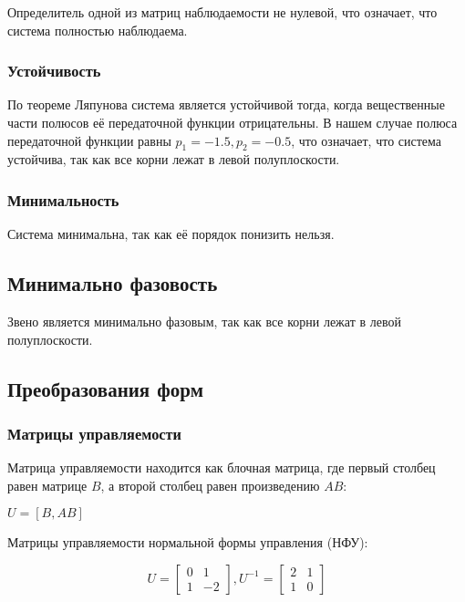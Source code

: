 Определитель одной из матриц наблюдаемости не нулевой, что означает, что система полностью наблюдаема.

\subsubsection{Устойчивость}

По теореме Ляпунова система является устойчивой тогда, когда вещественные части полюсов её передаточной функции отрицательны. В нашем случае полюса передаточной функции равны $p_1=-1.5, p_2=-0.5$, что означает, что система устойчива, так как все корни лежат в левой полуплоскости. 

\subsubsection{Минимальность}

Система минимальна, так как её порядок понизить нельзя.

\subsection{Минимально фазовость}

Звено является минимально фазовым, так как все корни лежат в левой полуплоскости. 

\subsection{Преобразования форм}

\subsubsection{Матрицы управляемости}

Матрица управляемости находится как блочная матрица, где первый столбец равен матрице $B$, а второй столбец равен произведению $AB$:

\begin{center}
$U=[B, AB]$
\end{center}

Матрицы управляемости нормальной формы управления (НФУ):

\begin{equation*}
\text{$U= \begin{bmatrix}
0 & 1\\ 1 & -2
\end{bmatrix}$}
\text{$, U^{-1}=\begin{bmatrix} 2 & 1 \\ 1 & 0 \end{bmatrix}$}
\end{equation*}

